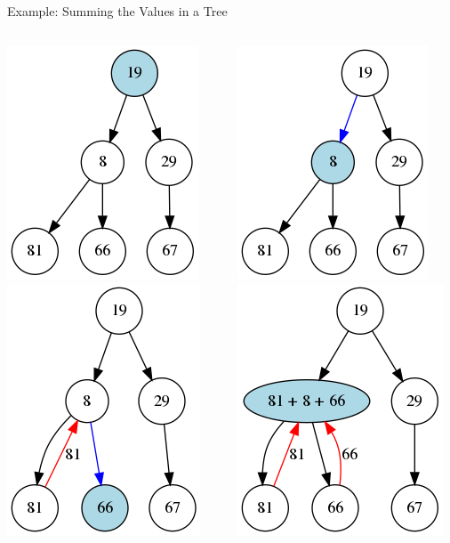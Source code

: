 \documentclass[11pt]{beamer}
\begin{document}
\begin{frame}{Example: Summing the Values in a Tree}
\begin{columns}
\begin{column}{0.33\textwidth}
\center
\includegraphics[scale=0.3]{summing_tree_1.png}
\includegraphics[scale=0.3]{summing_tree_4.png}
\end{column}
\begin{column}{0.33\textwidth}
\center
\includegraphics[scale=0.3]{summing_tree_2.png}
\includegraphics[scale=0.3]{summing_tree_5.png}

\end{column}
\end{columns}
\end{frame}
\end{document}
